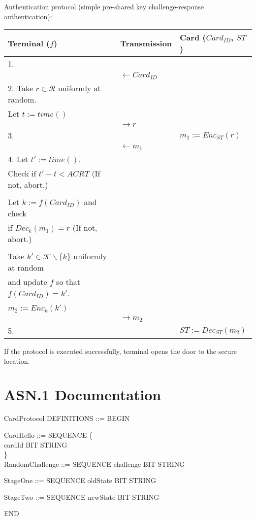 \documentclass[10pt,titlepage]{article}
\begin{document}
Authentication protocol (simple pre-shared key challenge-response authentication):
 \begin{table}[!ht]
 \centering
	\begin{tabular}{| p{6.55cm}   p{2.55cm}  p{4.55cm}| }
 \hline
 Terminal ($f$) & Transmission  & Card ($Card_{ID}$, $ST$) \\\hline
 1.  & & \\
 &  $\leftarrow Card_{ID}$  & \\
 2. Take $ r \in \mathcal{R} $ uniformly at random. &&\\
Let $t := time()$ &  &  \\ 
 & $\rightarrow r$ &  \\
 3.& &$m_1 := Enc_{ST} (r)$ \\
 &  $\leftarrow m_1$  & \\
4. Let $t' := time()$. &&\\
Check if $t' - t < ACRT$ (If not, abort.) &&\\
&&\\
Let $k := f(Card_{ID})$ and check &&\\ 
if $Dec_k(m_1) = r$ (If not, abort.)&&\\
&&\\
Take $k' \in \mathcal{K} \backslash \{k\} $ uniformly at random &&\\
and update $f$ so that $f(Card_{ID}) = k'$.&&\\
&&\\
$m_2 := Enc_{k}(k')$& & \\
 & $\rightarrow m_2$ &  \\ 
5. & & $ ST := Dec_{ST} (m_2)$ \\
 \hline

 \end{tabular}
 \end{table}
 
If the protocol is executed successfully, terminal opens the door to the secure location.
 

\section*{ASN.1 Documentation}

CardProtocol DEFINITIONS ::= BEGIN

    CardHello ::= SEQUENCE \{\\
        cardId       BIT STRING\\
   \}\\

    RandomChallenge ::= SEQUENCE {
        challenge    BIT STRING
    }

    StageOne ::= SEQUENCE {
        oldState     BIT STRING
    }

    StageTwo ::= SEQUENCE {
        newState     BIT STRING
    }

END
\end{document}
